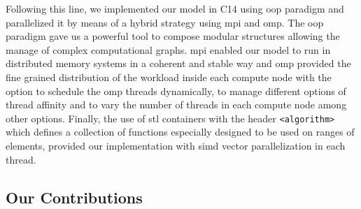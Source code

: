 \documentclass[10pt,journal,compsoc]{IEEEtran}
\newcommand{\CC}{C\nolinebreak\hspace{-.05em}\raisebox{.4ex}{\tiny\bf +}\nolinebreak\hspace{-.10em}\raisebox{.4ex}{\tiny\bf +}}
\begin{document}
Following this line, we implemented our model in \CC14 using \gls{oop} paradigm and parallelized it by means of a hybrid strategy using \gls{mpi} and \gls{omp}. The \gls{oop} paradigm gave us a powerful tool to compose modular structures allowing the manage of complex computational graphs. \gls{mpi} enabled our model to run in distributed memory systems in a coherent and stable way and \gls{omp} provided the fine grained distribution of the workload inside each compute node with the option to schedule the \gls{omp} threads dynamically, to manage different options of thread affinity and to vary the number of threads in each compute node among other options. Finally, the use of \gls{stl} containers with the header \texttt{<algorithm>} which defines a collection of functions especially designed to be used on ranges of elements, provided our implementation with \gls{simd} vector parallelization in each thread.














\subsection{Our Contributions}
\end{document}
